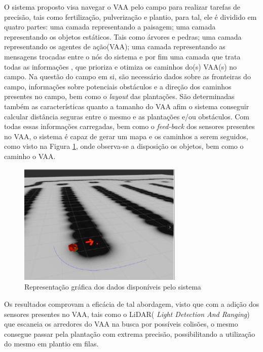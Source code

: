 O sistema proposto visa navegar o VAA pelo campo para realizar tarefas de precisão, tais como fertilização, pulverização e plantio, para tal, ele é dividido em quatro partes: uma camada representando a paisagem; uma camada representando os objetos estáticos. Tais como árvores e pedras; uma camada representando os agentes de ação(VAA); uma camada representando as mensagens trocadas entre o nós do sistema e por fim uma camada que trata todas as informações , que prioriza e otimiza os caminhos do(s) VAA(s) no campo. Na questão do campo em si, são necessário dados sobre as fronteiras do campo, informações sobre potenciais obstáculos e a direção dos caminhos presentes no campo, bem como o \textit{layout} das plantações. São determinadas também as características quanto a tamanho do VAA afim o sistema conseguir calcular distância seguras entre o mesmo e as plantações e/ou obstáculos. Com todas essas informações carregadas, bem como o \textit{feed-back} dos sensores presentes no VAA, o sistema é capaz de gerar um mapa e os caminhos a serem seguidos, como visto na Figura \ref{fig:caminho-objetos-scheduling}, onde observa-se a disposição os objetos, bem como o caminho o VAA. 
\begin{figure}[H]
    \centering
    \includegraphics[width=0.7\textwidth]{figuras/caminho-objetos-scheduling.png}
    \caption{Representação gráfica dos dados disponíveis pelo sistema}
    \label{fig:caminho-objetos-scheduling}
\end{figure}

Os resultados comprovam a eficácia de tal abordagem, visto que com a adição dos sensores presentes no VAA, tais como o LiDAR(\textit{ Light Detection And Ranging}) que escaneia os arredores do VAA na busca por possíveis colisões, o mesmo consegue passar pela plantação com extrema precisão, possibilitando a utilização do mesmo em plantio em filas.
